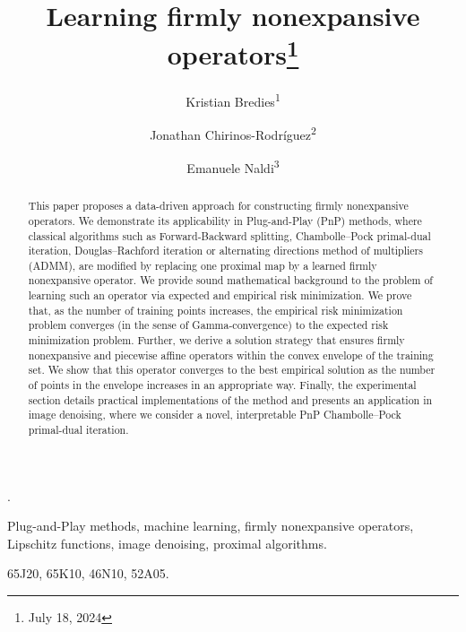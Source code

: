 \documentclass[onefignum,onetabnum]{siamonline250211}
\title{Learning firmly nonexpansive operators{\renewcommand{\thefootnote}{}\thanks{July 18, 2024}}}
\author{Kristian Bredies\textsuperscript{1} \and Jonathan Chirinos-Rodríguez\textsuperscript{2} \and Emanuele Naldi\textsuperscript{3}}
\begin{document}
.

\maketitle

\begin{abstract}
This paper proposes a data-driven approach for constructing firmly nonexpansive operators. We demonstrate its applicability in Plug-and-Play (PnP) methods, where classical algorithms such as Forward-Backward splitting, Chambolle--Pock primal-dual iteration, Douglas--Rachford iteration or alternating directions method of multipliers (ADMM), are modified by replacing one proximal map by a learned firmly nonexpansive operator. We provide sound mathematical background to the problem of learning such an operator via expected and empirical risk minimization. We prove that, as the number of training points increases, the empirical risk minimization problem converges (in the sense of Gamma-convergence) to the expected risk minimization problem. Further, we derive a solution strategy that ensures firmly nonexpansive and piecewise affine operators within the convex envelope of the training set. We show that this operator converges to the best empirical solution as the number of points in the envelope increases in an appropriate way. Finally, the experimental section details practical implementations of the method and presents an application in image denoising, where we consider a novel, interpretable PnP Chambolle--Pock primal-dual iteration.
\end{abstract}

\begin{keywords} Plug-and-Play methods, machine learning, firmly nonexpansive operators, Lipschitz functions, image denoising, proximal algorithms.
\end{keywords}

\begin{AMS}
65J20, %
65K10, %
46N10, %
52A05. %
\end{AMS}
\end{document}
